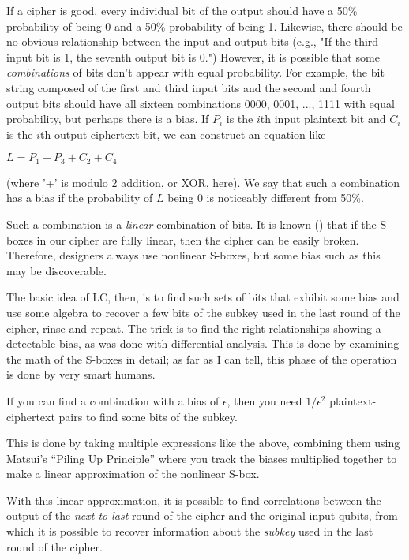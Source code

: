 If a cipher is good, every individual bit of the output should have a
50\% probability of being 0 and a 50\% probability of being 1.
Likewise, there should be no obvious relationship between the input
and output bits (e.g., "If the third input bit is 1, the seventh
output bit is 0.")  However, it is possible that some \emph{combinations}
of bits don't appear with equal probability. For example, the bit
string composed of the first and third input bits and the second and
fourth output bits should have all sixteen combinations 0000, 0001,
..., 1111 with equal probability, but perhaps there is a bias.  If $P_i$
is the $i$th input plaintext bit and $C_i$ is the $i$th output ciphertext
bit, we can construct an equation like

$L = P_1 + P_3 + C_2 + C_4$

(where '+' is modulo 2 addition, or XOR, here).  We say that such a
combination has a bias if the probability of $L$ being 0 is noticeably
different from 50\%.

Such a combination is a \emph{linear} combination of bits.  It is known () that if the S-boxes in our cipher are fully linear, then the
cipher can be easily broken.  Therefore, designers always use
nonlinear S-boxes, but some bias such as this may be discoverable.

The basic idea of LC, then, is to find such sets of bits that exhibit
some bias and use some algebra to recover a few bits of the subkey
used in the last round of the cipher, rinse and repeat.  The trick is
to find the right relationships showing a detectable bias, as was done
with differential analysis.  This is done by examining the math of the
S-boxes in detail; as far as I can tell, this phase of the operation
is done by very smart humans.

If you can find a combination with a bias of $\epsilon$, then you need
$1/\epsilon^2$ plaintext-ciphertext pairs to find some bits of the
subkey.

This is done by taking multiple expressions like the above, combining
them using Matsui's ``Piling Up Principle'' where you track the biases
multiplied together to make a linear approximation of the nonlinear
S-box.

With this linear approximation, it is possible to find correlations
between the output of the \emph{next-to-last} round of the cipher and the
original input qubits, from which it is possible to recover
information about the \emph{subkey} used in the last round of the cipher.

